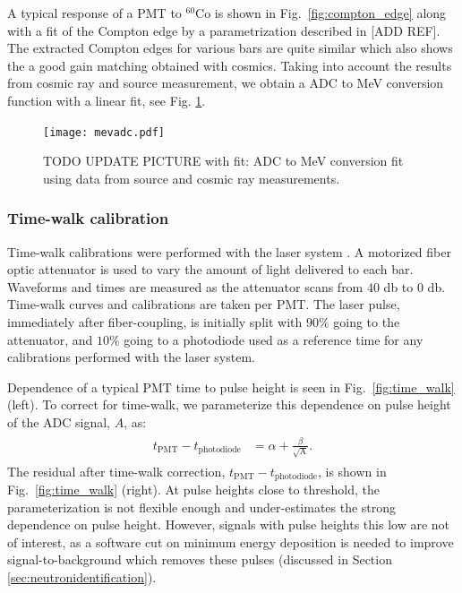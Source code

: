 \documentclass[3p,final,twocolumn]{elsarticle}
\begin{document}
A typical response of a PMT to  $^{60}$Co is shown in Fig.~\ref{fig:compton_edge} along with a fit of the Compton edge by a parametrization described in [ADD REF]. The extracted Compton edges for various bars are quite similar which also shows the a good gain matching obtained with cosmics. Taking into account the results from cosmic ray and  source measurement, we obtain a ADC to MeV conversion function with a linear fit, see Fig. \ref{fig:mev_conversion}.


\begin{figure}[tbh]
	\centering
			\texttt{[image: mevadc.pdf]}
	\caption{TODO UPDATE PICTURE with fit: ADC to MeV conversion fit using data from source and cosmic ray measurements.}
	\label{fig:mev_conversion}
\end{figure}

\subsubsection{Time-walk calibration}
Time-walk calibrations were performed with the laser system \cite{band-laser}. A motorized fiber optic attenuator is used to vary
the amount of light delivered to each bar. Waveforms and times are measured as the attenuator scans from $40$ \si{\decibel} to $0$ 
\si{\decibel}. Time-walk curves and calibrations are taken per PMT. The laser pulse, immediately after fiber-coupling, is initially 
split with $90\%$ going to the attenuator, and $10\%$ going to a photodiode used as a reference time for any calibrations 
performed with the laser system.

Dependence of a typical PMT time to pulse height is seen in Fig.~\ref{fig:time_walk} (left). To correct for time-walk, we parameterize 
this dependence on pulse height of the ADC signal, $A$, as:
\begin{eqnarray}
	\begin{split}
		t_{\mathrm{PMT}}-t_{\mathrm{photodiode}}	&= \alpha + \frac{\beta}{\sqrt{\textrm{A}}}.				
		\label{eqn:time_walk}
	\end{split}
\end{eqnarray}
The residual after time-walk correction, $t_{\mathrm{PMT}}-t_{\mathrm{photodiode}}$, is shown in Fig.~\ref{fig:time_walk} (right). At pulse heights close to threshold, the 
parameterization is not flexible enough and under-estimates the strong dependence on pulse height. However, signals with pulse 
heights this low are not of interest, as a software cut on minimum energy deposition is needed to improve signal-to-background 
which removes these pulses (discussed in Section \ref{sec:neutronidentification}).
\end{document}
